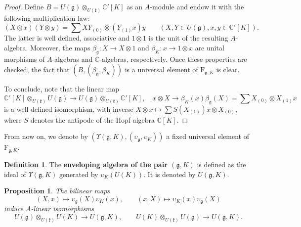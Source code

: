 \documentclass{amsart}
\newtheorem{proposition}[theorem]{Proposition}
\theoremstyle{definition}
\newtheorem{definition}[theorem]{Definition}
\begin{document}
\begin{proof}
    Define $B = U(\mathfrak{g}) \otimes_{U(\mathfrak{k})}\mathbb{C}'[K]$ as an $A$-module and endow it with the following multiplication law:
    \[ (X \otimes x)(Y \otimes y) = \sum XY_{(0)} \otimes (Y_{(1)}x)y \qquad (X,Y \in U(\mathfrak{g}), x,y \in \mathbb{C}'[K]).\]
    The latter is well defined, associative and $1 \otimes 1$ is the unit of the resulting $A$-algebra. Moreover, the maps $\beta_\mathfrak{g} : X \to X \otimes 1$ and $\beta_K : x \to 1 \otimes x$ are unital morphisms of $A$-algebras and $\mathbb{C}$-algebras, respectively. Once these properties are checked, the fact that $(B, (\beta_\mathfrak{g}, \beta_K))$ is a universal element of $\bm{\mathrm{F}}_{\mathfrak{g},K}$ is clear.

    To conclude, note that the linear map \[\mathbb{C}'[K]\otimes_{U(\mathfrak{k})}U(\mathfrak{g})\to U(\mathfrak{g}) \otimes_{U(\mathfrak{k})}\mathbb{C}'[K], \quad x \otimes X \to \beta_K(x) \beta_\mathfrak{g}(X) = \sum X_{(0)} \otimes X_{(1)}x\]
    is a well defined isomorphism, with inverse $X \otimes x \mapsto \sum S(X_{(1)})x \otimes X_{(0)}$, where $S$ denotes the antipode of the Hopf algebra $\mathbb{C}[K]$.
\end{proof}

From now on, we denote by $(\Upsilon(\mathfrak{g},K), (\upsilon_\mathfrak{g}, \upsilon_K))$ a fixed universal element of $\bm{\mathrm{F}}_{\mathfrak{g},K}$.

\begin{definition}\label{definition_enveloping_algebra}
    The \textbf{enveloping algebra of the pair $(\mathfrak{g},K)$} is defined as the ideal of $\Upsilon(\mathfrak{g},K)$ generated by $\upsilon_K(U(K))$. It is denoted by $U(\mathfrak{g},K)$.
\end{definition}

\begin{proposition}\label{structureU}
    The bilinear maps \[(X,x) \longmapsto \upsilon_\mathfrak{g}(X) \upsilon_K(x), \qquad (x,X) \longmapsto \upsilon_K(x) \upsilon_\mathfrak{g}(X)\] induce $A$-linear isomorphisms \begin{equation} \label{isomorphisms} U(\mathfrak{g}) \otimes_{U(\mathfrak{k})}U(K) \to U(\mathfrak{g},K), \qquad U(K)\otimes_{U(\mathfrak{k})}U(\mathfrak{g})\to U(\mathfrak{g},K).\end{equation}
\end{proposition}
\end{document}
